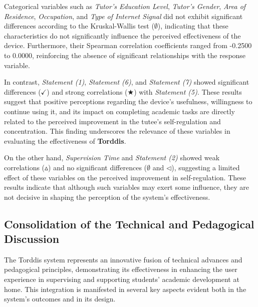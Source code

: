                 Categorical variables such as \textit{Tutor's Education Level}, \textit{Tutor's Gender}, \textit{Area of Residence}, \textit{Occupation}, and \textit{Type of Internet Signal} did not exhibit significant differences according to the Kruskal-Wallis test (\(\emptyset\)), indicating that these characteristics do not significantly influence the perceived effectiveness of the device. Furthermore, their Spearman correlation coefficients ranged from -0.2500 to 0.0000, reinforcing the absence of significant relationships with the response variable.
                
                In contrast, \textit{Statement (1)}, \textit{Statement (6)}, and \textit{Statement (7)} showed significant differences (\(\checkmark\)) and strong correlations (\(\bigstar\)) with \textit{Statement (5)}. These results suggest that positive perceptions regarding the device's usefulness, willingness to continue using it, and its impact on completing academic tasks are directly related to the perceived improvement in the tutee’s self-regulation and concentration. This finding underscores the relevance of these variables in evaluating the effectiveness of \textbf{Torddis}.
                
                On the other hand, \textit{Supervision Time} and \textit{Statement (2)} showed weak correlations (\(\vartriangle\)) and no significant differences (\(\emptyset\) and \(\triangleleft\)), suggesting a limited effect of these variables on the perceived improvement in self-regulation. These results indicate that although such variables may exert some influence, they are not decisive in shaping the perception of the system's effectiveness.
                
                \subsection{Consolidation of the Technical and Pedagogical Discussion}
                The Torddis system represents an innovative fusion of technical advances and pedagogical principles, demonstrating its effectiveness in enhancing the user experience in supervising and supporting students’ academic development at home. This integration is manifested in several key aspects evident both in the system's outcomes and in its design.
                
